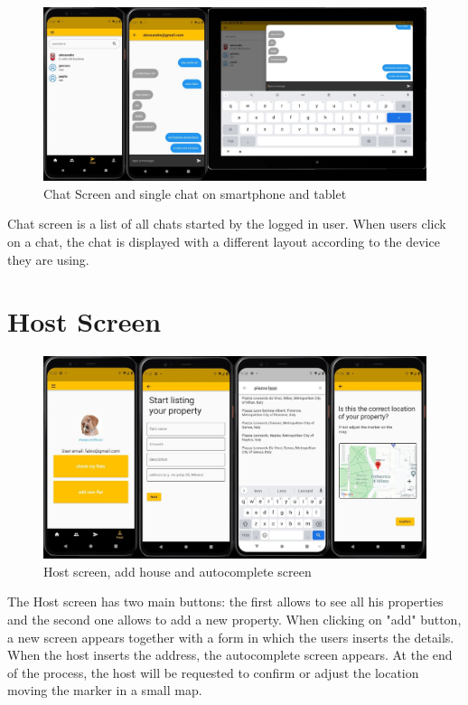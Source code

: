 \begin{figure}[H]
    \centering
    \includegraphics[scale = 0.25]{images/chatscreen.jpeg}
    \caption{Chat Screen and single chat on smartphone and tablet}
\end{figure}
Chat screen is a list of all chats started by the logged in user. When users click on a chat, the chat is displayed with a different layout according to the device they are using.\\

\section{Host Screen}

\begin{figure}[H]
    \centering
    \includegraphics[scale = 0.25]{images/hostscreen.jpeg}
    \caption{Host screen, add house and autocomplete screen}
\end{figure}
The Host screen has two main buttons: the first allows to see all his properties and the second one allows to add a new property. When clicking on "add" button, a new screen appears together with a form in which the users inserts the details. When the host inserts the address, the autocomplete screen appears. At the end of the process, the host will be requested to confirm or adjust the location moving the marker in a small map.\\